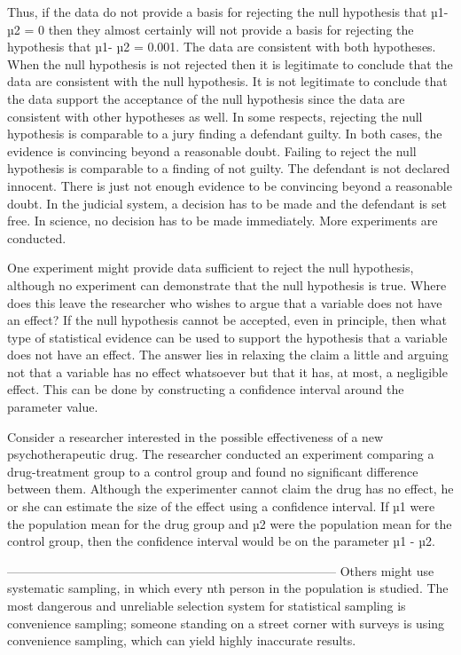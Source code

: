 Thus, if the data do not provide a basis for rejecting the null hypothesis that µ1- µ2 = 0 then they almost certainly will not provide a basis for rejecting the hypothesis that µ1- µ2 = 0.001. The data are consistent with both hypotheses. When the null hypothesis is not rejected then it is legitimate to conclude that the data are consistent with the null hypothesis. It is not legitimate to conclude that the data support the acceptance of the null hypothesis since the data are consistent with other hypotheses as well. In some respects, rejecting the null hypothesis is comparable to a jury finding a defendant guilty. In both cases, the evidence is convincing beyond a reasonable doubt. Failing to reject the null hypothesis is comparable to a finding of not guilty. The defendant is not declared innocent. There is just not enough evidence to be convincing beyond a reasonable doubt. In the judicial system, a decision has to be made and the defendant is set free. In science, no decision has to be made immediately. More experiments are conducted.


One experiment might provide data sufficient to reject the null hypothesis, although no experiment can demonstrate that the null hypothesis is true. Where does this leave the researcher who wishes to argue that a variable does not have an effect? If the null hypothesis cannot be accepted, even in principle, then what type of statistical evidence can be used to support the hypothesis that a variable does not have an effect. The answer lies in relaxing the claim a little and arguing not that a variable has no effect whatsoever but that it has, at most, a negligible effect. This can be done by constructing a confidence interval around the parameter value.


Consider a researcher interested in the possible effectiveness of a new psychotherapeutic drug. The researcher conducted an experiment comparing a drug-treatment group to a control group and found no significant difference between them. Although the experimenter cannot claim the drug has no effect, he or she can estimate the size of the effect using a confidence interval. If µ1 were the population mean for the drug group and µ2 were the population mean for the control group, then the confidence interval would be on the parameter µ1 - µ2. 






--------------------------------------------------------------------------------
Others might use systematic sampling, in which every nth person in the population is studied. The most dangerous and unreliable selection system for statistical sampling is convenience sampling; someone standing on a street corner with surveys is using convenience sampling, which can yield highly inaccurate results.



